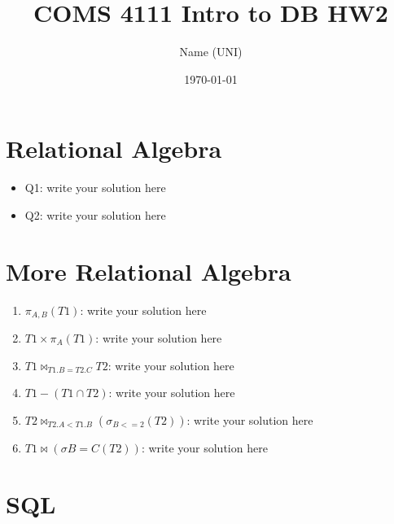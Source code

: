 \documentclass{article}
\title{COMS 4111 Intro to DB HW2}
\author{Name (UNI)}
\date{\today}
\begin{document}
\maketitle



\pagebreak

\section{Relational Algebra}
\begin{itemize}
    \item Q1: write your solution here
    
    \item Q2: write your solution here
    
\end{itemize}

\newpage

\section{More Relational Algebra}

\begin{enumerate}
    \item $\pi_{A,B}(T1)$: write your solution here
    
    \item $T1 \times \pi _A(T1)$: write your solution here
    
    \item $T1 \bowtie_{T1.B=T2.C} T2$: write your solution here 
    
    \item $T1 - (T1 \cap T2)$: write your solution here 
    
    \item $T2 \bowtie_{T2.A < T1.B} (\sigma_{B<=2}(T2))$: write your solution here 
    
    \item $T1 \bowtie (\sigma{B=C}(T2))$: write your solution here 
\end{enumerate}

\newpage

\section{SQL}
\end{document}
